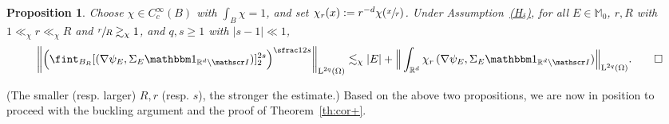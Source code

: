 \documentclass[10pt]{amsart}
\let\mathcal\mathscr
\newcommand{\Hd}{\hyperref[Hd]{\textup{(H$_\delta$)}}\xspace}
\let\mathds\mathbbm
\theoremstyle{plain}
\newtheorem{propo}[theor]{Proposition}
\theoremstyle{definition}
\newcommand{\R}{\mathbb R}
\newcommand{\Ic}{\mathcal I}
\newcommand{\Md}{\mathbb M}
\newcommand{\Ld}{\operatorname{L}}
\begin{document}
\begin{propo}\label{prop:interpol}
Choose \mbox{$\chi\in C^\infty_c(B)$} with $\int_B\chi=1$, and set $\chi_r(x):=r^{-d}\chi(\sfrac xr)$.
Under Assumption~\Hd, for all $E\in\Md_0$, $r,R$ with $1\ll_\chi r\ll_\chi R$ and $\sfrac rR\gtrsim_\chi1$, and \hbox{$q,s\ge1$} with $|s-1|\ll1$,
\[\bigg\|\Big(\fint_{B_{R}}[(\nabla\psi_E,\Sigma_E\mathds1_{\R^d\setminus\Ic})]_2^{2s}\Big)^{\sfrac1{2s}}\bigg\|_{\Ld^{2q}(\Omega)}\lesssim_\chi |E|+\Big\|\int_{\R^d}\chi_r\,(\nabla\psi_E,\Sigma_E\mathds1_{\R^d\setminus\Ic})\Big\|_{\Ld^{2q}(\Omega)}.\qedhere\]
\end{propo}
(The smaller (resp. larger) $R,r$ (resp. $s$), the stronger the estimate.)
Based on the above two propositions, we are now in position to proceed with the buckling argument and the proof of Theorem~\ref{th:cor+}.
\end{document}
